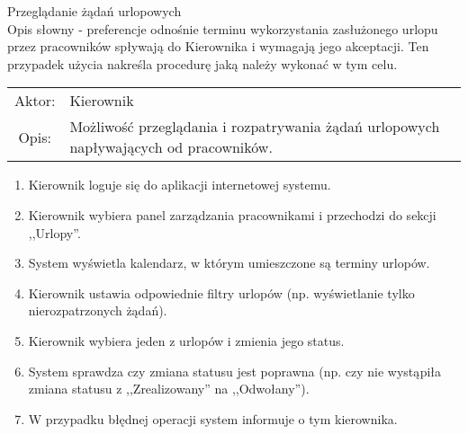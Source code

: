   \item Przeglądanie żądań urlopowych \\
  
  Opis słowny - preferencje odnośnie terminu wykorzystania zasłużonego urlopu
  przez pracowników spływają do Kierownika i wymagają jego akceptacji. Ten
  przypadek użycia nakreśla procedurę jaką należy wykonać w tym celu.
  
  \begin{tabularx}{\linewidth}{ c X }
  Aktor: & Kierownik \\
  Opis: & Możliwość przeglądania i rozpatrywania żądań urlopowych napływających od pracowników.\\
  \end{tabularx}
  \begin{enumerate}
    \item Kierownik loguje się do aplikacji internetowej systemu.
    \item Kierownik wybiera panel zarządzania pracownikami i przechodzi do sekcji ,,Urlopy''.
    \item System wyświetla kalendarz, w którym umieszczone są terminy urlopów.
    \item Kierownik ustawia odpowiednie filtry urlopów (np. wyświetlanie tylko nierozpatrzonych żądań).
    \item Kierownik wybiera jeden z urlopów i zmienia jego status.
    \item System sprawdza czy zmiana statusu jest poprawna (np. czy nie wystąpiła zmiana statusu z ,,Zrealizowany'' na ,,Odwołany'').
    \item W przypadku błędnej operacji system informuje o tym kierownika.
  \end{enumerate}